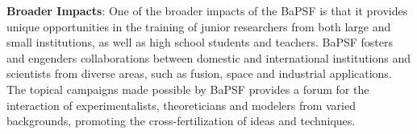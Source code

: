 \documentclass[11pt]{article}
\begin{document}
{\bfseries Broader Impacts}:  One of the broader
impacts of the BaPSF is that it provides unique opportunities in the
training of junior researchers from both large and small institutions,
as well as high school students and teachers. BaPSF fosters and
engenders collaborations between domestic and international
institutions and scientists from diverse areas, such as fusion, space
and industrial applications. The topical campaigns made possible by
BaPSF provides a forum for the interaction of experimentalists,
theoreticians and modelers from varied backgrounds, promoting the
cross-fertilization of ideas and techniques.
\end{document}
